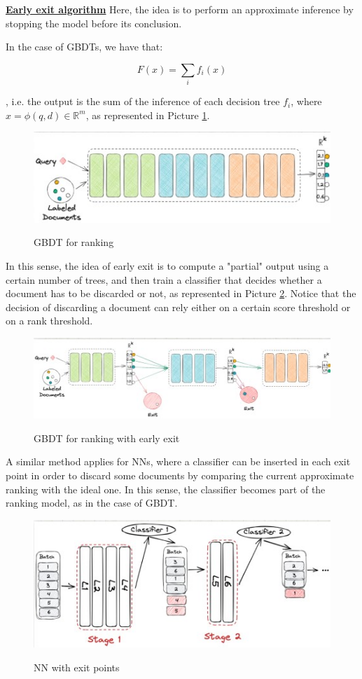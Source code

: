 \underline{\textbf{Early exit algorithm}}
Here, the idea is to perform an approximate inference by stopping the model before its conclusion. 

In the case of GBDTs, we have that:

$$
F(x) = \sum_i f_i(x)
$$

, i.e. the output is the sum of the inference of each decision tree $f_i$, where $x = \phi(q,d) \in \mathbb{R}^m$, as represented in Picture \ref{gdbt}.

\begin{figure}[h!]
		\centering
		\includegraphics[scale = 2.5]{img/gdbt.jpg}
        \label{gdbt}
        \caption{GBDT for ranking}
\end{figure}

In this sense, the idea of early exit is to compute a "partial" output using a certain number of trees, and then train a classifier that decides whether a document has to be discarded or not, as represented in Picture \ref{gdbt early}. Notice that the decision of discarding a document can rely either on a certain score threshold or on a rank threshold. 

\begin{figure}[h!]
		\centering
		\includegraphics[scale = 2.5]{img/gdbt early exit.jpg}
        \label{gdbt early}
        \caption{GBDT for ranking with early exit}
\end{figure}

A similar method applies for NNs, where a classifier can be inserted in each exit point in order to discard some documents by comparing the current approximate ranking with the ideal one. In this sense, the classifier becomes part of the ranking model, as in the case of GBDT.

\begin{figure}[h!]
		\centering
		\includegraphics[scale = 2.5]{img/nn exit.jpg}
        \label{nn eaxit}
        \caption{NN with exit points}
\end{figure}

